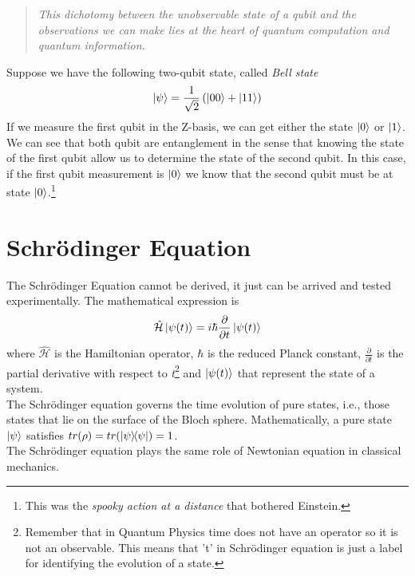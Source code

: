 \blockquote{\textit{This dichotomy between the unobservable state of a qubit and the observations we can make lies at the heart of quantum computation and quantum information.}\\
\cite{Nielsen2010QuantumInformation}}
Suppose we have the following two-qubit state, called \textit{Bell state}
\begin{equation}
    \ket{\psi} = \frac{1}{\sqrt{2}}\left(\ket{00} + \ket{11}\right)
\end{equation}
If we measure the first qubit in the Z-basis, we can get either the state $\ket{0}$ or $\ket{1}$. We can see that both qubit are entanglement in the sense that knowing the state of the first qubit allow us to determine the state of the second qubit. In this case, if the first qubit measurement is $\ket{0}$ we know that the second qubit must be at state $\ket{0}$.\footnote{This was the \textit{spooky action at a distance} that bothered Einstein.} 
\section{Schrödinger Equation}
The Schrödinger Equation cannot be derived, it just can be arrived and tested experimentally. The mathematical expression is
\begin{equation}
    \hat{\mathcal{H}}\ket{\psi(t)} = i\hbar \frac{\partial}{\partial t}\ket{\psi(t)}
\end{equation}
where $\hat{\mathcal{H}}$ is the Hamiltonian operator, $\hbar$ is the reduced Planck constant, $\frac{\partial}{\partial t}$ is the partial derivative with respect to \textit{t}\footnote{Remember that in Quantum Physics time does not have an operator so it is not an observable. This means that 't' in Schrödinger equation is just a label for identifying the evolution of a state.} and $\ket{\psi(t)}$ that represent the state of a system.\\
The Schrödinger equation governs the time evolution of pure states, i.e., those states that lie on the surface of the Bloch sphere. Mathematically, a pure state $\ket{\psi}$ satisfies $tr(\rho) = tr(\ketbra{\psi}{\psi}) = 1$.\\
The Schrödinger equation plays the same role of Newtonian equation in classical mechanics. 
